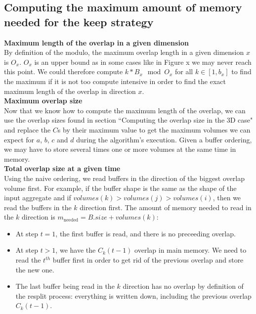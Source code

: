 \documentclass[conference]{IEEEtran}
\begin{document}
\subsection{Computing the maximum amount of memory needed for the keep strategy}

\noindent \textbf{Maximum length of the overlap in a given dimension} \\
By definition of the modulo, the maximum overlap length in a given dimension $x$ is $O_x$.
$O_x$ is an upper bound as in some cases like in Figure x we may never reach this point.
We could therefore compute $k * B_x \mod O_x$ for all $k \in [1, b_x]$ to find the maximum if it is not too compute intensive in order to find the exact maximum length of the overlap in direction $x$. \\

\noindent \textbf{Maximum overlap size} \\
Now that we know how to compute the maximum length of the overlap, we can use the overlap sizes found in section ``Computing the overlap size in the 3D case" and replace the $C$s by their maximum value to get the maximum volumes we can expect for $a$, $b$, $c$ and $d$ during the algorithm's execution.
Given a buffer ordering, we may have to store several times one or more volumes at the same time in memory. \\

\noindent \textbf{Total overlap size at a given time} \\

Using the naive ordering, we read buffers in the direction of the biggest overlap volume first.
For example, if the buffer shape is the same as the shape of the input aggregate and if $volumes(k) > volumes(j) > volumes(i)$, then we read the buffers in the $k$ direction first.
The amount of memory needed to read in the $k$ direction is $m_{\textrm{needed}} = B.size + volumes(k)$:

\begin{itemize}
  \item At step $t = 1$, the first buffer is read, and there is no preceeding overlap.
  \item At step $t > 1$, we have the $C_k(t-1)$ overlap in main memory. We need to read the $t^{th}$ buffer first in order to get rid of the previous overlap and store the new one.
  \item The last buffer being read in the $k$ direction has no overlap by definition of the resplit process: everything is written down, including the previous overlap $C_k(t-1)$.
\end{itemize}
\end{document}

